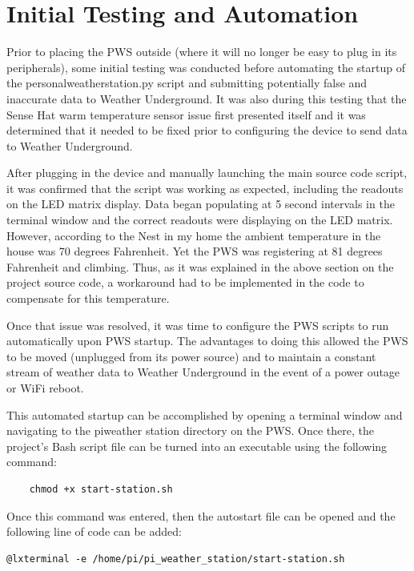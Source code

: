 \documentclass[sigconf]{acmart}
\begin{document}
\section{Initial Testing and Automation}

Prior to placing the PWS outside (where it will no longer be easy to plug in its peripherals), some initial testing was conducted before automating the startup of the personal\textunderscore weather\textunderscore station.py script and submitting potentially false and inaccurate data to Weather Underground. It was also during this testing that the Sense Hat warm temperature sensor issue first presented itself and it was determined that it needed to be fixed prior to configuring the device to send data to Weather Underground. 

After plugging in the device and manually launching the main source code script, it was confirmed that the script was working as expected, including the readouts on the LED matrix display. Data began populating at 5 second intervals in the terminal window and the correct readouts were displaying on the LED matrix. However, according to the Nest in my home the ambient temperature in the house was 70 degrees Fahrenheit. Yet the PWS was registering at 81 degrees Fahrenheit and climbing. Thus, as it was explained in the above section on the project source code, a workaround had to be implemented in the code to compensate for this temperature. 

Once that issue was resolved, it was time to configure the PWS scripts to run automatically upon PWS startup. The advantages to doing this allowed the PWS to be moved (unplugged from its power source) and to maintain a constant stream of weather data to Weather Underground in the event of a power outage or WiFi reboot. 

This automated startup can be accomplished by opening a terminal window and navigating to the pi\textunderscore weather \textunderscore station directory on the PWS. Once there, the project's Bash script file can be turned into an executable using the following command:


\begin{verbatim}
    chmod +x start-station.sh
\end{verbatim}


Once this command was entered, then the autostart file can be opened and the following line of code can be added:


\begin{verbatim}
@lxterminal -e /home/pi/pi_weather_station/start-station.sh
\end{verbatim}
\end{document}
